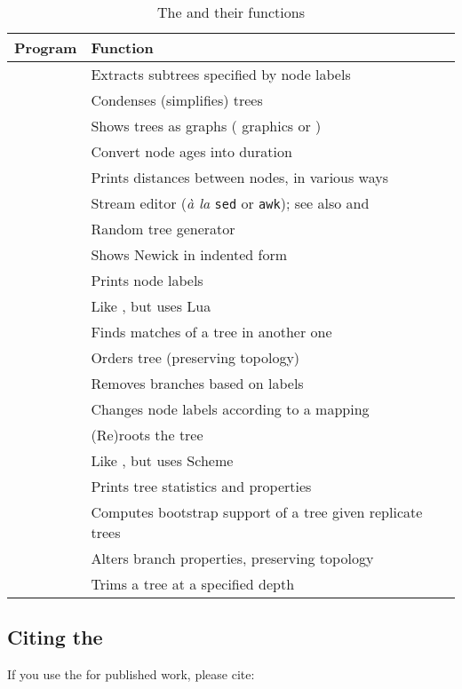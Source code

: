 \begin{table}[t]
\begin{tabular}{ll}
{\bf Program} & {\bf Function } \\
\hline
\clade		&	Extracts subtrees specified by node labels\\
\condense	&	Condenses (simplifies) trees \\
\display	&	Shows trees as graphs (\ascii{} graphics or \svg) \\
\duration	&	Convert node ages into duration \\
\distance	&	Prints distances between nodes, in various ways \\
\ed				&	Stream editor (\textit{\`{a} la} \texttt{sed} or \texttt{awk}); see also \luaed{} and \sched \\
\gen			&	Random tree generator \\
\nwindent	&	Shows Newick in indented form \\ 
		&	Prints node labels \\
\luaed				&	Like \ed, but uses Lua\\
\match		&	Finds matches of a tree in another one \\
\order		&	Orders tree (preserving topology) \\
\prune		&	Removes branches based on labels \\ 
\rename		&	Changes node labels according to a mapping \\
\reroot		&	(Re)roots the tree \\
\sched				&	Like \luaed, but uses Scheme\\
\stats		&	Prints tree statistics and properties \\
\support	&	Computes bootstrap support of a tree given replicate trees \\
\topology	&	Alters branch properties, preserving topology \\
\trim		&	Trims a tree at a specified depth
\end{tabular}	
\caption{The \nutils{} and their functions}
\label{tbl_prog_list}
\end{table}

\subsection*{Citing the \nutils}

If you use the \nutils{} for published work, please cite:


